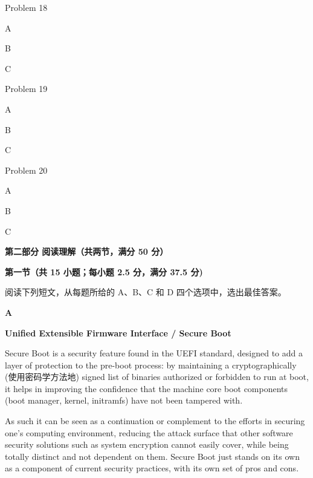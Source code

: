 \documentclass{exam-zh}
\begin{document}
\begin{question}
Problem 18
\begin{choices}
\item A
\item B
\item C
\end{choices}
\end{question}

\begin{question}
Problem 19
\begin{choices}
\item A
\item B
\item C
\end{choices}
\end{question}

\begin{question}
Problem 20
\begin{choices}
\item A
\item B
\item C
\end{choices}
\end{question}

\begin{flushleft}
{\bfseries 第二部分 \hspace{0.5em} 阅读理解（共两节，满分 50 分）}

{\bfseries 第一节（共 15 小题；每小题 2.5 分，满分 37.5 分)}
\end{flushleft}

阅读下列短文，从每题所给的 A、B、C 和 D 四个选项中，选出最佳答案。

{\centering \bfseries A \par}

{\centering \bfseries Unified Extensible Firmware Interface / Secure Boot \par}

Secure Boot is a security feature found in the UEFI standard, designed to add a layer of protection to the pre-boot process: by maintaining a cryptographically (使用密码学方法地) signed list of binaries authorized or forbidden to run at boot, it helps in improving the confidence that the machine core boot components (boot manager, kernel, initramfs) have not been tampered with.

As such it can be seen as a continuation or complement to the efforts in securing one's computing environment, reducing the attack surface that other software security solutions such as system encryption cannot easily cover, while being totally distinct and not dependent on them. Secure Boot just stands on its own as a component of current security practices, with its own set of pros and cons.
\end{document}
